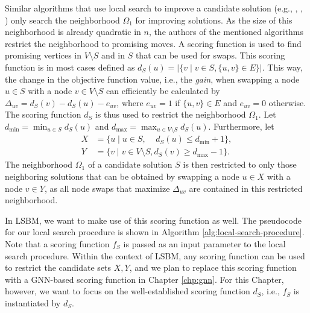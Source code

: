 \documentclass[draft,final]{vutinfth} %
\begin{document}
Similar algorithms that use local search to improve a candidate solution (e.g.,  \cite{chen_nuqclq_2021}, \cite{djeddi_extension_2019}, \cite{zhou_opposition-based_2020}) only search the neighborhood $\Omega_1$ for improving solutions. As the size of this neighborhood is already quadratic in $n$, the authors of the mentioned algorithms restrict the neighborhood to promising moves. A scoring function is used to find promising vertices in $V \setminus S$ and in $S$ that can be used for swaps. This scoring function is in most cases defined as $d_S(u) = |\{v \mid v \in S, \{u,v\} \in E \}|$. This way, the change in the objective function value, i.e., the \emph{gain}, when swapping a node $u \in S$ with a node $v \in V \setminus S$ can efficiently be calculated by $\Delta_{uv} = d_S(v) - d_S(u) - e_{uv}$, where $e_{uv} = 1$ if $\{u,v\} \in E$ and $e_{uv} = 0$ otherwise. 
The scoring function $d_S$ is thus used to restrict the neighborhood $\Omega_1$. 
Let $d_{\min} = \min_{u \in S} d_S(u)$ and $d_{\max} = \max_{u \in V \setminus S} d_S(u)$.
Furthermore, let 
\begin{align*}
    X &= \{ u \mid u \in S,~~~~~ d_S(u) \leq d_{\min} + 1 \}, \\
    Y &= \{ v \mid v \in V \setminus S, d_S(v) \geq d_{\max} - 1 \}.
\end{align*} The neighborhood $\Omega_1$ of a candidate solution $S$ is then restricted to only those neighboring solutions that can be obtained by swapping a node $u \in X$ with a node $v \in Y$, as all node swaps that maximize $\Delta_{uv}$ are contained in this restricted neighborhood. 

In LSBM, we want to make use of this scoring function as well. The pseudocode for our local search procedure is shown in Algorithm \ref{alg:local-search-procedure}. Note that a scoring function $f_S$ is passed as an input parameter to the local search procedure. Within the context of LSBM, any scoring function can be used to restrict the candidate sets $X, Y$, and we plan to replace this scoring function with a GNN-based scoring function in Chapter \ref{chp:gnn}. 
For this Chapter, however, we want to focus on the well-established scoring function $d_S$, i.e., $f_S$ is instantiated by $d_S$. 
\end{document}
